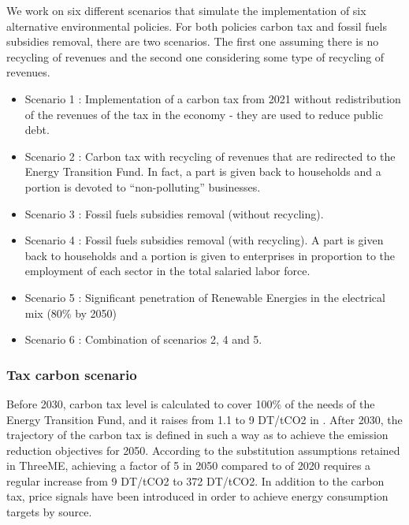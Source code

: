 \documentclass[
]{article}
\begin{document}
We work on six different scenarios that simulate the implementation of
six alternative environmental policies. For both policies carbon tax and
fossil fuels subsidies removal, there are two scenarios. The first one
assuming there is no recycling of revenues and the second one
considering some type of recycling of revenues.

\begin{itemize}
\item
  Scenario 1 : Implementation of a carbon tax from 2021 without
  redistribution of the revenues of the tax in the economy - they are
  used to reduce public debt.
\item
  Scenario 2 : Carbon tax with recycling of revenues that are redirected
  to the Energy Transition Fund. In fact, a part is given back to
  households and a portion is devoted to ``non-polluting'' businesses.
\item
  Scenario 3 : Fossil fuels subsidies removal (without recycling).
\item
  Scenario 4 : Fossil fuels subsidies removal (with recycling). A part
  is given back to households and a portion is given to enterprises in
  proportion to the employment of each sector in the total salaried
  labor force.
\item
  Scenario 5 : Significant penetration of Renewable Energies in the
  electrical mix (80\% by 2050)
\item
  Scenario 6 : Combination of scenarios 2, 4 and 5.
\end{itemize}

\hypertarget{tax-carbon-scenario}{%
\subsubsection{Tax carbon scenario}\label{tax-carbon-scenario}}

Before 2030, carbon tax level is calculated to cover 100\% of the needs
of the Energy Transition Fund, and it raises from 1.1 to 9 DT/tCO2 in .
After 2030, the trajectory of the carbon tax is defined in such a way as
to achieve the emission reduction objectives for 2050. According to the
substitution assumptions retained in ThreeME, achieving a factor of 5 in
2050 compared to of 2020 requires a regular increase from 9 DT/tCO2 to
372 DT/tCO2. In addition to the carbon tax, price signals have been
introduced in order to achieve energy consumption targets by source.
\end{document}
